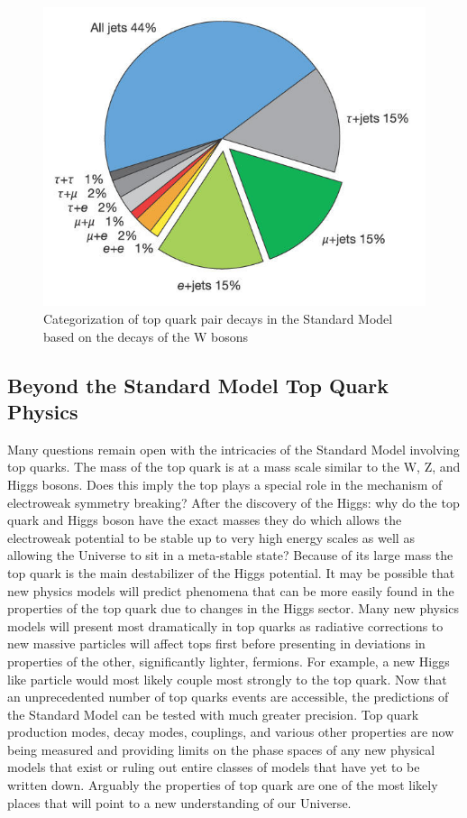 \begin{figure}[h!]
	\centering
	\includegraphics[width=.5\columnwidth]{../ThesisImages/Theory/topdecayproducts.jpg}
	\caption[Categorization of top quark pair decays in the Standard Model based on the decays of the W bosons]{Categorization of top quark pair decays in the Standard Model based on the decays of the W bosons\cite{Abazov:2004cs}}
	\label{fig:ttdecayprods}
\end{figure}


\subsection{Beyond the Standard Model Top Quark Physics}

Many questions remain open with the intricacies of the Standard Model involving top quarks.  The mass of the top quark is at a mass scale similar to the W, Z, and Higgs bosons.  Does this imply the top plays a special role in the mechanism of electroweak symmetry breaking?  After the discovery of the Higgs: why do the top quark and Higgs boson have the exact masses they do which allows the electroweak potential to be stable up to very high energy scales as well as allowing the Universe to sit in a meta-stable state\cite{TopReview}?  Because of its large mass the top quark is the main destabilizer of the Higgs potential.  It may be possible that new physics models will predict phenomena that can be more easily found in the properties of the top quark due to changes in the Higgs sector.  Many new physics models will present most dramatically in top quarks as radiative corrections to new massive particles will affect tops first before presenting in deviations in properties of the other, significantly lighter, fermions.  For example, a new Higgs like particle would most likely couple most strongly to the top quark.  
 Now that an unprecedented number of top quarks events are accessible, the predictions of the Standard Model can be tested with much greater precision.  Top quark production modes, decay modes, couplings, and various other properties are now being measured and providing limits on the phase spaces of any new physical models that exist or ruling out entire classes of models that have yet to be written down.  Arguably the properties of top quark are one of the most likely places that will point to a new understanding of our Universe.

